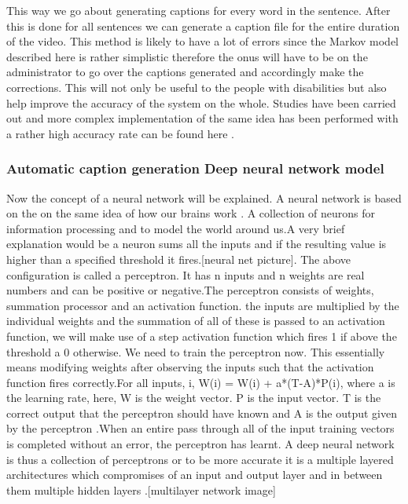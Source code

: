 \documentclass[sigconf]{acmart}
\begin{document}
This way we go about generating captions for every word in the sentence. After this is done for all sentences we can generate a caption file for the entire duration of the video. This method is likely to have a lot of errors since the Markov model described here is rather simplistic therefore the onus will have to be on the administrator to go over the captions generated and accordingly make the corrections. This will not only be useful to the people with disabilities but also help improve the accuracy of the system on the whole. Studies have been carried out and more complex implementation of the same idea has been performed with a rather high accuracy rate can be found here \cite{Hakkani-Tur2017}.
\newline
\subsubsection{Automatic caption generation Deep neural network model}
Now the concept of a neural network will be explained. A neural network is based on the on the same idea of how our brains work \cite{wikip[edia2017} . A collection of neurons for information processing and to model the world around us.A very brief explanation would be a neuron sums all the inputs and if the resulting value is higher than a specified threshold it fires.[neural net picture].
The above configuration is called a perceptron. It has n inputs and n weights are real numbers and can be positive or negative.The perceptron consists of weights, summation processor and an activation function. the inputs are multiplied by the individual weights and the summation of all of these is passed to an activation function, we will make use of a step activation function which fires 1 if above the threshold a 0 otherwise\cite{wikip[edia2017}. We need to train the perceptron now. This essentially means modifying weights after observing the inputs such that the activation function fires correctly.For all inputs, i, W(i) = W(i) + a*(T-A)*P(i), where a is the learning rate, here, W is the weight vector. P is the input vector. T is the correct output that the perceptron should have known and A is the output given by the perceptron \cite{wikip[edia2017}.When an entire pass through all of the input training vectors is completed without an error, the perceptron has learnt. A deep neural network is thus a collection of perceptrons or to be more accurate it is a multiple layered architectures which compromises of an input and output layer and in between them multiple hidden layers \cite{2017}.[multilayer network image]
\end{document}
